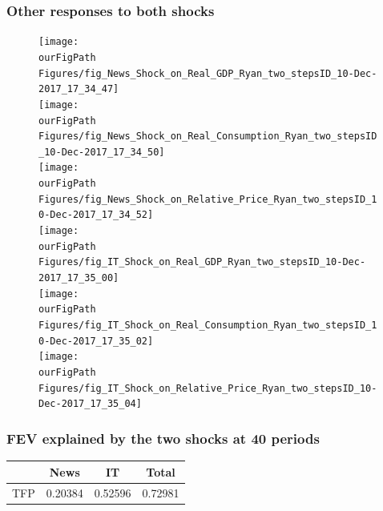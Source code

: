\documentclass{beamer}
\def \ourFigPath {../../}
\begin{document}
\begin{frame}
\frametitle{Other responses to  both shocks}

\vspace{-0.2cm}
\begin{figure}
\begin{multicols}{2}
\centering 
\texttt{[image: \\ourFigPath Figures/fig\_News\_Shock\_on\_Real\_GDP\_Ryan\_two\_stepsID\_10-Dec-2017\_17\_34\_47]}\\ 
\vspace{0.3cm}
\texttt{[image: \\ourFigPath Figures/fig\_News\_Shock\_on\_Real\_Consumption\_Ryan\_two\_stepsID\_10-Dec-2017\_17\_34\_50]}\\ 
\vspace{0.3cm}
\texttt{[image: \\ourFigPath Figures/fig\_News\_Shock\_on\_Relative\_Price\_Ryan\_two\_stepsID\_10-Dec-2017\_17\_34\_52]}\\ 


\texttt{[image: \\ourFigPath Figures/fig\_IT\_Shock\_on\_Real\_GDP\_Ryan\_two\_stepsID\_10-Dec-2017\_17\_35\_00]}\\
\vspace{0.3cm}
\texttt{[image: \\ourFigPath Figures/fig\_IT\_Shock\_on\_Real\_Consumption\_Ryan\_two\_stepsID\_10-Dec-2017\_17\_35\_02]}\\ 
\vspace{0.3cm}
\texttt{[image: \\ourFigPath Figures/fig\_IT\_Shock\_on\_Relative\_Price\_Ryan\_two\_stepsID\_10-Dec-2017\_17\_35\_04]}\\ 

\end{multicols}
\end{figure}


\end{frame}


\begin{frame}
	\frametitle{FEV explained by the two shocks at 40 periods}


    \hspace{2.25cm}
\begin{large}
	\begin{tabular}{lccc}
	\hline
		& News & IT & Total \\
		\hline
	TFP	           & 0.20384  & 0.52596 & 0.72981  \\
		\hline
	\end{tabular}
\end{large}
		 	
\end{frame}
\end{document}

